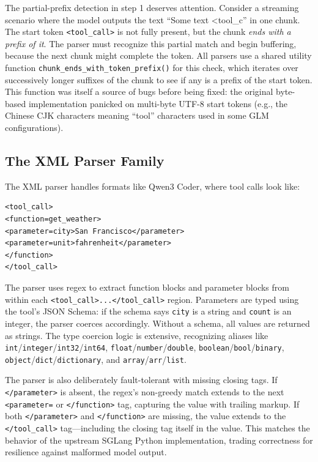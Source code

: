 The partial-prefix detection in step 1 deserves attention. Consider a streaming scenario where the model outputs the text ``Some text <tool\_c'' in one chunk. The start token \texttt{<tool\_call>} is not fully present, but the chunk \emph{ends with a prefix of it}. The parser must recognize this partial match and begin buffering, because the next chunk might complete the token. All parsers use a shared utility function \texttt{chunk\_ends\_with\_token\_prefix()} for this check, which iterates over successively longer suffixes of the chunk to see if any is a prefix of the start token. This function was itself a source of bugs before being fixed: the original byte-based implementation panicked on multi-byte UTF-8 start tokens (e.g., the Chinese CJK characters meaning ``tool'' characters used in some GLM configurations).

\subsection{The XML Parser Family}

The XML parser handles formats like Qwen3 Coder, where tool calls look like:

\begin{verbatim}
<tool_call>
<function=get_weather>
<parameter=city>San Francisco</parameter>
<parameter=unit>fahrenheit</parameter>
</function>
</tool_call>
\end{verbatim}

The parser uses regex to extract function blocks and parameter blocks from within each \texttt{<tool\_call>...</tool\_call>} region. Parameters are typed using the tool's JSON Schema: if the schema says \texttt{city} is a string and \texttt{count} is an integer, the parser coerces accordingly. Without a schema, all values are returned as strings. The type coercion logic is extensive, recognizing aliases like \texttt{int}/\texttt{integer}/\texttt{int32}/\texttt{int64}, \texttt{float}/\texttt{number}/\texttt{double}, \texttt{boolean}/\texttt{bool}/\texttt{binary}, \texttt{object}/\texttt{dict}/\texttt{dictionary}, and \texttt{array}/\texttt{arr}/\texttt{list}.

The parser is also deliberately fault-tolerant with missing closing tags. If \texttt{</parameter>} is absent, the regex's non-greedy match extends to the next \texttt{<parameter=} or \texttt{</function>} tag, capturing the value with trailing markup. If both \texttt{</parameter>} and \texttt{</function>} are missing, the value extends to the \texttt{</tool\_call>} tag---including the closing tag itself in the value. This matches the behavior of the upstream SGLang Python implementation, trading correctness for resilience against malformed model output.

